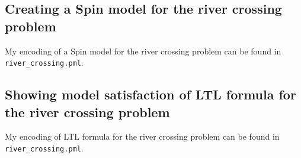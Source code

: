 \documentclass{article}
\newcommand{\code}[1]{\texttt{#1}}
\begin{document}
\subsection{Creating a Spin model for the river crossing problem}

My encoding of a Spin model for the river crossing problem can be found in \code{river\_crossing.pml}.

\subsection{Showing model satisfaction of LTL formula for the river crossing problem}

My encoding of LTL formula for the river crossing problem can be found in \code{river\_crossing.pml}.
\end{document}
